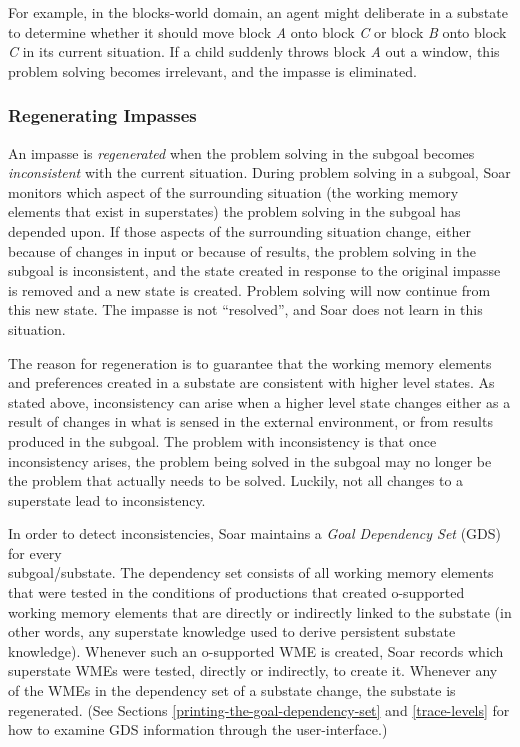 For example, in the blocks-world domain, an agent might deliberate in a substate to determine whether it should move block \textit{A} onto block \textit{C} or block \textit{B} onto block \textit{C} in its current situation. If a child suddenly throws block \textit{A} out a window, this problem solving becomes irrelevant, and the impasse is eliminated.

\subsubsection*{Regenerating Impasses}

An impasse is \textit{regenerated} when the problem solving in the subgoal becomes {\em inconsistent} with the current situation.  During problem solving in a subgoal, Soar monitors which aspect of the surrounding situation (the working memory elements that exist in superstates) the problem solving in the subgoal has depended upon.  If those aspects of the surrounding situation change, either because of changes in input or because of results, the problem solving in the subgoal is inconsistent, and the state created in response to the original impasse is removed and a new state is created. Problem solving will now continue from this new state.  The impasse is not ``resolved'', and Soar does not learn in this situation.

The reason for regeneration is to guarantee that the working memory elements and preferences created in a substate are consistent with higher level states.  As stated above, inconsistency can arise when a higher level state changes either as a result of changes in what is sensed in the external environment, or from results produced in the subgoal.  The problem with inconsistency is that once inconsistency arises, the problem being solved in the subgoal may no longer be the problem that actually needs to be solved.  Luckily, not all changes to a superstate lead to inconsistency.

In order to detect inconsistencies, Soar maintains a \emph{Goal Dependency Set} (GDS) for every \\
subgoal/substate. The dependency set consists of all working memory elements that were tested in the conditions of productions that created o-supported working memory elements that are directly or indirectly linked to the substate (in other words, any superstate knowledge  used to derive persistent substate knowledge). Whenever such an o-supported WME is created, Soar records which superstate WMEs were tested, directly or indirectly, to create it. Whenever any of the WMEs in the dependency set of a substate change, the substate is regenerated. (See Sections \ref{printing-the-goal-dependency-set} and \ref{trace-levels} for how to examine GDS information through the user-interface.)

